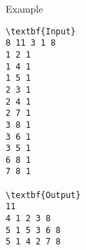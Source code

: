 Example
\begin{verbatim}
\textbf{Input}
8 11 3 1 8
1 2 1
1 4 1
1 5 1
2 3 1
2 4 1
2 7 1
3 8 1
3 6 1
3 5 1
6 8 1
7 8 1

\textbf{Output}
11
4 1 2 3 8
5 1 5 3 6 8
5 1 4 2 7 8

\end{verbatim}